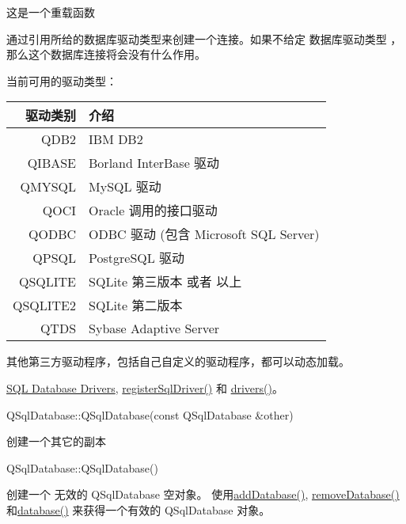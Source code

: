 这是一个重载函数

通过引用所给的数据库驱动类型来创建一个连接。如果不给定 数据库驱动类型 ，那么这个数据库连接将会没有什么作用。

当前可用的驱动类型：

\begin{tabular}{|r|l|}
	\hline	
	驱动类别& 介绍\\
	\hline
	QDB2&	IBM DB2\\
		\hline
	QIBASE	&Borland InterBase 驱动\\
		\hline
	QMYSQL	&MySQL 驱动\\
		\hline
	QOCI	&Oracle 调用的接口驱动\\
		\hline
	QODBC	&ODBC 驱动 (包含 Microsoft SQL Server)\\
		\hline
	QPSQL	&PostgreSQL 驱动\\
		\hline
	QSQLITE	&SQLite 第三版本 或者 以上\\
		\hline
	QSQLITE2&	SQLite 第二版本\\
		\hline
	QTDS	&Sybase Adaptive Server\\
	\hline
\end{tabular}

其他第三方驱动程序，包括自己自定义的驱动程序，都可以动态加载。

\begin{seeAlso}
\href{https://doc.qt.io/qt-5/sql-driver.html}{SQL Database Drivers}, \href{https://github.com/QtDocumentCN/QtDocumentCN/blob/master/Src/S/QSqlDatabase/QSqlDatabase.md#static-void-qsqldatabaseregistersqldriverconst-qstring-name-qsqldrivercreatorbase-creator}{registerSqlDriver()} 和 \href{https://github.com/QtDocumentCN/QtDocumentCN/blob/master/Src/S/QSqlDatabase/QSqlDatabase.md#static-qstringlist-qsqldatabasedrivers}{drivers()}。
\end{seeAlso}


QSqlDatabase::QSqlDatabase(const QSqlDatabase \&other)

创建一个其它的副本

QSqlDatabase::QSqlDatabase()

创建一个 无效的 QSqlDatabase 空对象。
使用\href{https://github.com/QtDocumentCN/QtDocumentCN/blob/master/Src/S/QSqlDatabase/QSqlDatabase.md#static-qsqldatabase-qsqldatabaseadddatabaseconst-qstring-type-const-qstring-connectionname--qlatin1stringdefaultconnection}{addDatabase()},  \href{https://github.com/QtDocumentCN/QtDocumentCN/blob/master/Src/S/QSqlDatabase/QSqlDatabase.md#static-void-qsqldatabaseremovedatabaseconst-qstring-connectionname}{removeDatabase()} 和\href{https://github.com/QtDocumentCN/QtDocumentCN/blob/master/Src/S/QSqlDatabase/QSqlDatabase.md#static-qsqldatabase-qsqldatabasedatabaseconst-qstring-connectionname--qlatin1stringdefaultconnection-bool-open--true}{database()} 来获得一个有效的 QSqlDatabase 对象。

